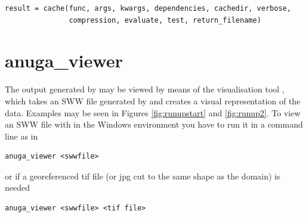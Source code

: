 \documentclass{manual}
\begin{document}
\begin{verbatim}
result = cache(func, args, kwargs, dependencies, cachedir, verbose,
               compression, evaluate, test, return_filename)
\end{verbatim}



\pagebreak
\section{anuga\_viewer}
\label{sec:anuga_viewer}

The output generated by \anuga may be viewed by
means of the visualisation tool , which takes an
SWW file generated by \anuga and creates a visual representation
of the data. Examples may be seen in Figures \ref{fig:runupstart}
and \ref{fig:runup2}. To view an SWW file with
 in the Windows environment you have to run it in a command line as in
\begin{verbatim}
anuga_viewer <swwfile>
\end{verbatim} 

or if a georeferenced tif file (or jpg cut to the same shape as the domain) is needed

\begin{verbatim} 
anuga_viewer <swwfile> <tif file>
\end{verbatim} 






\end{document}
